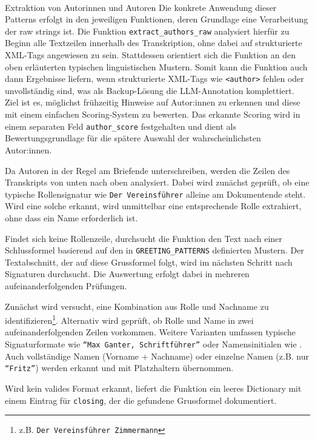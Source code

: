 \documentclass[12pt, a4paper, ngerman, bidi=default]{article}
\makeatletter
\newcommand{\code}[1]{\colorbox{VeryLightGray}{\texttt{#1}}} %
\let\oldparagraph\paragraph%
\renewcommand{\paragraph}{
    \@ifstar%
      \xxxParagraphStar%
      \xxxParagraphNoStar%
 }
\newcommand{\xxxParagraphStar}[1]{\oldparagraph*{#1}\mbox{}}
\newcommand{\xxxParagraphNoStar}[1]{\oldparagraph{#1}\mbox{}}
\makeatother
\begin{document}
\paragraph{Extraktion von Autorinnen und Autoren}
Die konkrete Anwendung dieser Patterns erfolgt in den jeweiligen Funktionen, deren Grundlage eine Verarbeitung der raw strings ist. Die Funktion \code{extract\_authors\_raw} analysiert hierfür zu Beginn alle Textzeilen innerhalb des Transkription, ohne dabei auf strukturierte XML-Tags angewiesen zu sein. Stattdessen orientiert sich die Funktion an den oben erläuterten typischen linguistischen Mustern. Somit kann die Funktion auch dann Ergebnisse liefern, wenn strukturierte XML-Tags wie \code{<author>} fehlen oder unvollständig sind, was als Backup-Lösung die LLM-Annotation komplettiert. Ziel ist es, möglichst frühzeitig Hinweise auf Autor:innen zu erkennen und diese mit einem einfachen Scoring-System zu bewerten. Das erkannte Scoring wird in einem separaten Feld \code{author\_score} festgehalten und dient als Bewertungsgrundlage für die spätere Auswahl der wahrscheinlichsten Autor:innen.

Da Autoren in der Regel am Briefende unterschreiben, werden die Zeilen des Transkripts von unten nach oben analysiert. Dabei wird zunächst geprüft, ob eine typische Rollensignatur wie \texttt{Der Vereinsführer} alleine am Dokumentende steht. Wird eine solche erkannt, wird unmittelbar eine entsprechende Rolle extrahiert, ohne dass ein Name erforderlich ist.

Findet sich keine Rollenzeile, durchsucht die Funktion den Text nach einer Schlussformel basierend auf den in \code{GREETING\_PATTERNS} definierten Mustern. Der Textabschnitt, der auf diese Grussformel folgt, wird im nächsten Schritt nach Signaturen durchsucht. Die Auswertung erfolgt dabei in mehreren aufeinanderfolgenden Prüfungen.

Zunächst wird versucht, eine Kombination aus Rolle und Nachname zu identifizieren\footnote{z.B. \texttt{Der Vereinsführer Zimmermann}}.
Alternativ wird geprüft, ob Rolle und Name in zwei aufeinanderfolgenden Zeilen vorkommen.
Weitere Varianten umfassen typische Signaturformate wie \texttt{\enquote{Max Ganter, Schriftführer}} oder Namensinitialen wie \texttt{}.
Auch vollständige Namen (Vorname + Nachname) oder einzelne Namen (z.B. nur \texttt{\enquote{Fritz}}) werden erkannt und mit Platzhaltern übernommen.

Wird kein valides Format erkannt, liefert die Funktion ein leeres Dictionary mit einem Eintrag für \code{closing}, der die gefundene Grussformel dokumentiert.
\end{document}
